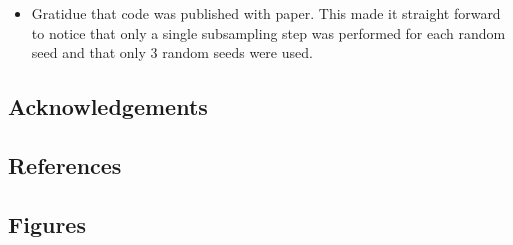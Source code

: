 \documentclass[
]{article}
\providecommand{\tightlist}{%
  \setlength{\itemsep}{0pt}\setlength{\parskip}{0pt}}
\newlength{\cslhangindent}
\newlength{\cslentryspacingunit} %
\newenvironment{CSLReferences}[2] %
 {%
  \setlength{\parindent}{0pt}
  \ifodd #1
  \let\oldpar\par
  \def\par{\hangindent=\cslhangindent\oldpar}
  \fi
  \setlength{\parskip}{#2\cslentryspacingunit}
 }%
 {}
\begin{document}
\begin{itemize}
\tightlist
\item
  Gratidue that code was published with paper. This made it straight
  forward to notice that only a single subsampling step was performed
  for each random seed and that only 3 random seeds were used.
\end{itemize}

\hypertarget{acknowledgements}{%
\subsection{Acknowledgements}\label{acknowledgements}}

\newpage

\hypertarget{references}{%
\subsection{References}\label{references}}

\setlength{\parindent}{-0.25in}
\setlength{\leftskip}{0.25in}

\noindent

\hypertarget{refs}{}
\begin{CSLReferences}{0}{0}
\end{CSLReferences}


\setlength{\parindent}{0in}
\setlength{\leftskip}{0in}

\newpage

\hypertarget{figures}{%
\subsection{Figures}\label{figures}}
\end{document}
